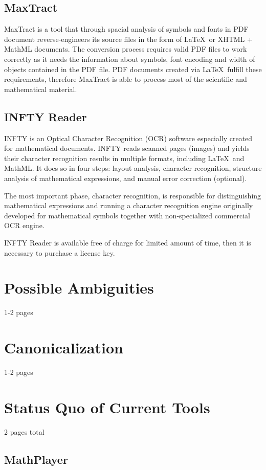 \documentclass[11pt,oneside,final]{fithesis2}
\begin{document}
\subsection{MaxTract}
MaxTract is a tool that through spacial analysis of symbols and fonts in PDF document reverse-engineers its source files in the form of \LaTeX\ or XHTML + MathML documents. The conversion process requires valid PDF files to work correctly as it needs the information about symbols, font encoding and width of objects contained in the PDF file. PDF documents created via \LaTeX\ fulfill these requirements, therefore MaxTract is able to process most of the scientific and mathematical material.


\subsection{INFTY Reader}
INFTY is an Optical Character Recognition (OCR) software especially created for mathematical documents. INFTY reads scanned pages (images) and yields their character recognition results in multiple formats, including \LaTeX\ and MathML. It does so in four steps: layout analysis, character recognition, structure analysis of mathematical expressions, and manual error correction (optional). 

The most important phase, character recognition, is responsible for distinguishing mathematical expressions and running a character recognition engine originally developed for mathematical symbols together with non-specialized commercial OCR engine. 

INFTY Reader is available free of charge for limited amount of time, then it is necessary to purchase a license key.

\section{Possible Ambiguities}
1-2 pages

\section{Canonicalization}
1-2 pages
\section{Status Quo of Current Tools}
2 pages total
\subsection{MathPlayer}
\end{document}

